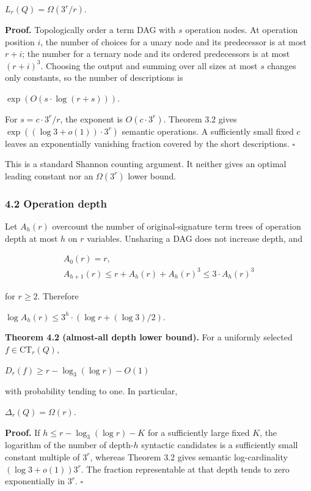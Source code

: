 \documentclass[
  11pt,
]{article}
\theoremstyle{definition}
\theoremstyle{remark}
\begin{document}
\(L_r(Q)=\Omega(3^r/r)\).

\textbf{Proof.} Topologically order a term DAG with \(s\) operation
nodes. At operation position \(i\), the number of choices for a unary
node and its predecessor is at most \(r+i\); the number for a ternary
node and its ordered predecessors is at most \((r+i)^3\). Choosing the
output and summing over all sizes at most \(s\) changes only constants,
so the number of descriptions is

\(\exp(O(s\mathbin{\cdot}\log(r+s)))\).

For \(s=c\mathbin{\cdot}3^r/r\), the exponent is
\(O(c\mathbin{\cdot}3^r)\). Theorem 3.2 gives
\(\exp((\log 3+o(1))\mathbin{\cdot}3^r)\) semantic operations. A
sufficiently small fixed \(c\) leaves an exponentially vanishing
fraction covered by the short descriptions. \(\square\)

This is a standard Shannon counting argument. It neither gives an
optimal leading constant nor an \(\Omega(3^r)\) lower bound.

\hypertarget{operation-depth}{%
\subsubsection{4.2 Operation depth}\label{operation-depth}}

Let \(A_h(r)\) overcount the number of original-signature term trees of
operation depth at most \(h\) on \(r\) variables. Unsharing a DAG does
not increase depth, and

\[
\begin{aligned}
A_0(r) = r, \\
A_{h+1}(r) \le  r + A_h(r) + A_h(r)^3 \le  3\mathbin{\cdot}A_h(r)^3
\end{aligned}
\]

for \(r\ge 2\). Therefore

\(\log A_h(r) \le  3^h\mathbin{\cdot}(\log r+(\log 3)/2)\).

\textbf{Theorem 4.2 (almost-all depth lower bound).} For a uniformly
selected \(f \in \mathrm{CT}_r(Q)\),

\(D_r(f) \ge  r-\log_3(\log r)-O(1)\)

with probability tending to one. In particular,

\(\Delta_r(Q)=\Omega(r)\).

\textbf{Proof.} If \(h\le r-\log_3(\log r)-K\) for a sufficiently large
fixed \(K\), the logarithm of the number of depth-\(h\) syntactic
candidates is a sufficiently small constant multiple of \(3^r\), whereas
Theorem 3.2 gives semantic log-cardinality \((\log 3+o(1))3^r\). The
fraction representable at that depth tends to zero exponentially in
\(3^r\). \(\square\)
\end{document}
